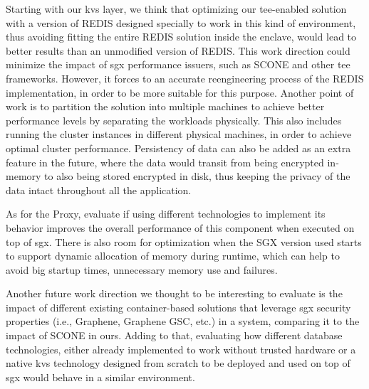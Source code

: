 Starting with our \gls{kvs} layer, we think that optimizing our \gls{tee}-enabled solution with a version of REDIS designed specially to work in this kind of environment, thus avoiding fitting the entire REDIS solution inside the enclave, would lead to better results than an unmodified version of REDIS. This work direction could minimize the impact of \gls{sgx} performance issuers, such as SCONE and other \gls{tee} frameworks. However, it forces to an accurate reengineering process of the REDIS implementation, in order to be more suitable for this purpose.
Another point of work is to partition the solution into multiple machines to achieve better performance levels by separating the workloads physically. This also includes running the cluster instances in different physical machines, in order to achieve optimal cluster performance.
Persistency of data can also be added as an extra feature in the future, where the data would transit from being encrypted in-memory to also being stored encrypted in disk, thus keeping the privacy of the data intact throughout all the application.

As for the Proxy, evaluate if using different technologies to implement its behavior improves the overall performance of this component when executed on top of \gls{sgx}.
There is also room for optimization when the SGX version used starts to support dynamic allocation of memory during runtime, which can help to avoid big startup times, unnecessary memory use and failures.

Another future work direction we thought to be interesting to evaluate is the impact of different existing container-based solutions that leverage \gls{sgx} security properties (i.e., Graphene, Graphene GSC, etc.) in a system, comparing it to the impact of SCONE in ours. 
Adding to that, evaluating how different database technologies, either already implemented to work without trusted hardware or a native \gls{kvs} technology designed from scratch to be deployed and used on top of \gls{sgx} would behave in a similar environment.
